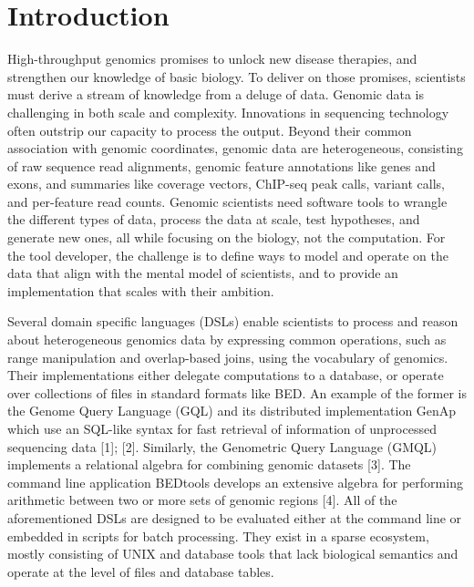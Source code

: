 \documentclass[10pt,letterpaper]{article}
\begin{document}
\linenumbers

\hypertarget{introduction}{%
\section{Introduction}\label{introduction}}

High-throughput genomics promises to unlock new disease therapies, and
strengthen our knowledge of basic biology. To deliver on those promises,
scientists must derive a stream of knowledge from a deluge of data.
Genomic data is challenging in both scale and complexity. Innovations in
sequencing technology often outstrip our capacity to process the output.
Beyond their common association with genomic coordinates, genomic data
are heterogeneous, consisting of raw sequence read alignments, genomic
feature annotations like genes and exons, and summaries like coverage
vectors, ChIP-seq peak calls, variant calls, and per-feature read
counts. Genomic scientists need software tools to wrangle the different
types of data, process the data at scale, test hypotheses, and generate
new ones, all while focusing on the biology, not the computation. For
the tool developer, the challenge is to define ways to model and operate
on the data that align with the mental model of scientists, and to
provide an implementation that scales with their ambition.

Several domain specific languages (DSLs) enable scientists to process
and reason about heterogeneous genomics data by expressing common
operations, such as range manipulation and overlap-based joins, using
the vocabulary of genomics. Their implementations either delegate
computations to a database, or operate over collections of files in
standard formats like BED. An example of the former is the Genome Query
Language (GQL) and its distributed implementation GenAp which use an
SQL-like syntax for fast retrieval of information of unprocessed
sequencing data {[}1{]}; {[}2{]}. Similarly, the Genometric Query
Language (GMQL) implements a relational algebra for combining genomic
datasets {[}3{]}. The command line application BEDtools develops an
extensive algebra for performing arithmetic between two or more sets of
genomic regions {[}4{]}. All of the aforementioned DSLs are designed to
be evaluated either at the command line or embedded in scripts for batch
processing. They exist in a sparse ecosystem, mostly consisting of UNIX
and database tools that lack biological semantics and operate at the
level of files and database tables.
\end{document}
